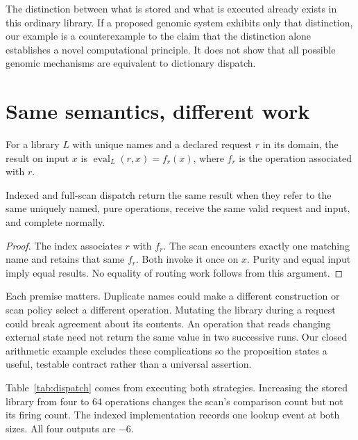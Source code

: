 The distinction between what is stored and what is executed already exists in
this ordinary library. If a proposed genomic system exhibits only that
distinction, our example is a counterexample to the claim that the distinction
alone establishes a novel computational principle. It does not show that all
possible genomic mechanisms are equivalent to dictionary dispatch.

\section{Same semantics, different work}
\begin{definition}
For a library $L$ with unique names and a declared request $r$ in its domain,
the result on input $x$ is $\operatorname{eval}_{L}(r,x)=f_r(x)$, where $f_r$ is
the operation associated with $r$.
\end{definition}

\begin{proposition}
Indexed and full-scan dispatch return the same result when they refer to the
same uniquely named, pure operations, receive the same valid request and input,
and complete normally.
\end{proposition}
\begin{proof}
The index associates $r$ with $f_r$. The scan encounters exactly one matching
name and retains that same $f_r$. Both invoke it once on $x$. Purity and equal
input imply equal results. No equality of routing work follows from this
argument.
\end{proof}

Each premise matters. Duplicate names could make a different construction or
scan policy select a different operation. Mutating the library during a request
could break agreement about its contents. An operation that reads changing
external state need not return the same value in two successive runs. Our
closed arithmetic example excludes these complications so the proposition
states a useful, testable contract rather than a universal assertion.

Table~\ref{tab:dispatch} comes from executing both strategies. Increasing the
stored library from four to 64 operations changes the scan's comparison count
but not its firing count. The indexed implementation records one lookup event
at both sizes. All four outputs are $-6$.

\begin{table}[htbp]
\centering

\caption{Logical event counts for the request $(\mathrm{double},-3)$. A firing
is one invocation of the selected arithmetic function. These are not CPU
instruction counts, elapsed times or learned-model measurements.}
\label{tab:dispatch}
\end{table}


